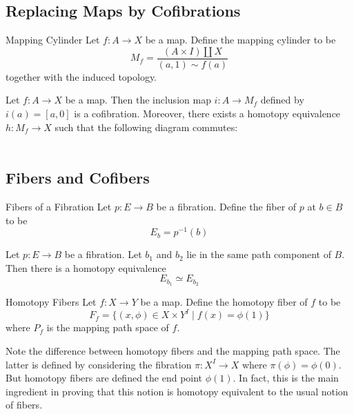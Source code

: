 \documentclass[a4paper]{article}
\begin{document}
\subsection{Replacing Maps by Cofibrations}
\begin{defn}{Mapping Cylinder}{} Let $f:A\to X$ be a map. Define the mapping cylinder to be $$M_f=\frac{(A\times I)\amalg X}{(a,1)\sim f(a)}$$ together with the induced topology. 
\end{defn}

\begin{thm}{}{} Let $f:A\to X$ be a map. Then the inclusion map $i:A\to M_f$ defined by $i(a)=[a,0]$ is a cofibration. Moreover, there exists a homotopy equivalence $h:M_f\to X$ such that the following diagram commutes: \\~\\
\end{thm}

\subsection{Fibers and Cofibers}
\begin{defn}{Fibers of a Fibration}{} Let $p:E\to B$ be a fibration. Define the fiber of $p$ at $b\in B$ to be $$E_b=p^{-1}(b)$$
\end{defn}

\begin{prp}{}{} Let $p:E\to B$ be a fibration. Let $b_1$ and $b_2$ lie in the same path component of $B$. Then there is a homotopy equivalence $$E_{b_1}\simeq E_{b_2}$$
\end{prp}

\begin{defn}{Homotopy Fibers}{} Let $f:X\to Y$ be a map. Define the homotopy fiber of $f$ to be $$F_f=\{(x,\phi)\in X\times Y^I\;|\;f(x)=\phi(1)\}$$ where $P_f$ is the mapping path space of $f$. 
\end{defn}

Note the difference between homotopy fibers and the mapping path space. The latter is defined by considering the fibration $\pi:X^I\to X$ where $\pi(\phi)=\phi(0)$. But homotopy fibers are defined the end point $\phi(1)$. In fact, this is the main ingredient in proving that this notion is homotopy equivalent to the usual notion of fibers. 
\end{document}
